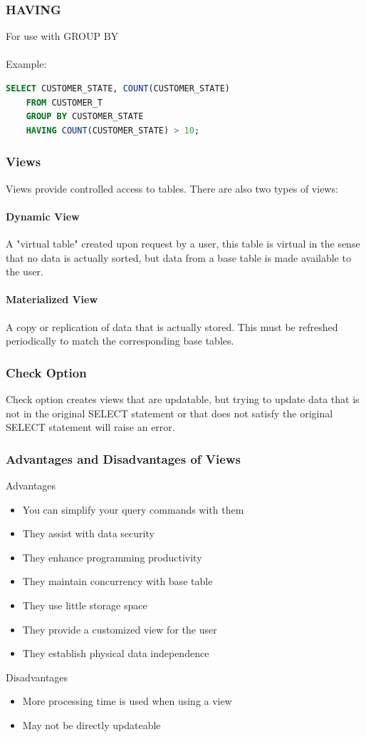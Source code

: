 \documentclass[12pt]{article}
\begin{document}
\subsubsection{HAVING}

For use with GROUP BY\\
\\
Example:\\

\begin{lstlisting}[language=SQL]
SELECT CUSTOMER_STATE, COUNT(CUSTOMER_STATE) 
	FROM CUSTOMER_T
	GROUP BY CUSTOMER_STATE
	HAVING COUNT(CUSTOMER_STATE) > 10;

\end{lstlisting}

\subsubsection{Views}
Views provide controlled access to tables. There are also two types of views:
\paragraph{Dynamic View} A "virtual table" created upon request by a user, this table is virtual in the sense that no data is actually sorted, but data from a base table is made available to the user.

\paragraph{Materialized View} A copy or replication of data that is actually stored. This must be refreshed periodically to match the corresponding base tables.

\subsubsection{Check Option}

Check option creates views that are updatable, but trying to update data that is not in the original SELECT statement or that does not satisfy the original SELECT statement will raise an error.

\subsubsection{Advantages and Disadvantages of Views}

Advantages
\begin{itemize}
	\item{You can simplify your query commands with them}
	\item{They assist with data security}
	\item{They enhance programming productivity}
	\item{They maintain concurrency with base table}
	\item{They use little storage space}
	\item{They provide a customized view for the user}
	\item{They establish physical data independence}
\end{itemize}

Disadvantages
\begin{itemize}
	\item{More processing time is used when using a view}
	\item{May not be directly updateable}
\end{itemize}
\end{document}
